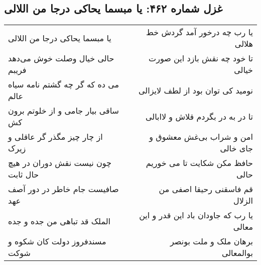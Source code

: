 \begin{center}
\section*{غزل شماره ۴۶۲: یا مبسما یحاکی درجا من اللالی}
\label{sec:sh462}
\begin{longtable}{l p{0.5cm} r}
یا مبسما یحاکی درجا من اللالی
&&
یا رب چه درخور آمد گردش خط هلالی
\\
حالی خیال وصلت خوش می‌دهد فریبم
&&
تا خود چه نقش بازد این صورت خیالی
\\
می ده که گر چه گشتم نامه سیاه عالم
&&
نومید کی توان بود از لطف لایزالی
\\
ساقی بیار جامی و از خلوتم برون کش
&&
تا در به در بگردم قلاش و لاابالی
\\
از چار چیز مگذر گر عاقلی و زیرک
&&
امن و شراب بی‌غش معشوق و جای خالی
\\
چون نیست نقش دوران در هیچ حال ثابت
&&
حافظ مکن شکایت تا می خوریم حالی
\\
صافیست جام خاطر در دور آصف عهد
&&
قم فاسقنی رحیقا اصفی من الزلال
\\
الملک قد تباهی من جده و جده
&&
یا رب که جاودان باد این قدر و این معالی
\\
مسندفروز دولت کان شکوه و شوکت
&&
برهان ملک و ملت بونصر بوالمعالی
\\
\end{longtable}
\end{center}
